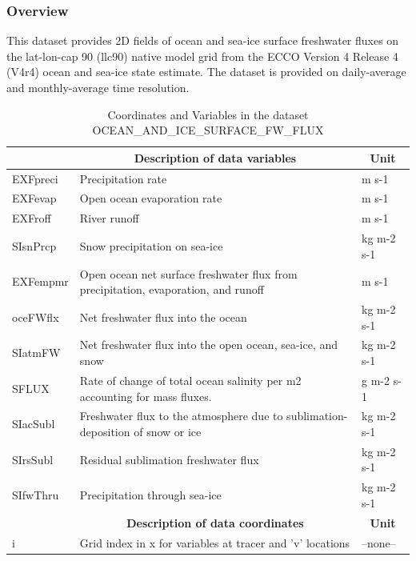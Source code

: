 \subsubsection{Overview}
This dataset provides 2D fields of ocean and sea-ice surface freshwater fluxes on the lat-lon-cap 90 (llc90) native model grid from the ECCO Version 4 Release 4 (V4r4) ocean and sea-ice state estimate. The dataset is provided on daily-average and monthly-average time resolution. 
\begin{longtable}{|m{}|m{}|m{}|}
\caption{Coordinates and Variables in the dataset OCEAN\_AND\_ICE\_SURFACE\_FW\_FLUX}
\label{tab:table-OCEAN_AND_ICE_SURFACE_FW_FLUX-fields} \\ 
\hline \endhead \hline \endfoot
\rowcolor{lightgray} \multicolumn{1}{|c|}{\textbf{Variables}} & \multicolumn{1}{|c|}{\textbf{Description of data variables}} &  \multicolumn{1}{|c|}{\textbf{Unit}}\\ \hline
EXFpreci &Precipitation rate &m s-1  \\ \hline
EXFevap &Open ocean evaporation rate &m s-1  \\ \hline
EXFroff &River runoff &m s-1  \\ \hline
SIsnPrcp &Snow precipitation on sea-ice &kg m-2 s-1  \\ \hline
EXFempmr &Open ocean net surface freshwater flux from precipitation, evaporation, and runoff &m s-1  \\ \hline
oceFWflx &Net freshwater flux into the ocean &kg m-2 s-1  \\ \hline
SIatmFW &Net freshwater flux into the open ocean, sea-ice, and snow &kg m-2 s-1  \\ \hline
SFLUX &Rate of change of total ocean salinity per m2 accounting for mass fluxes. &g m-2 s-1  \\ \hline
SIacSubl &Freshwater flux to the atmosphere due to sublimation-deposition of snow or ice &kg m-2 s-1  \\ \hline
SIrsSubl &Residual sublimation freshwater flux &kg m-2 s-1  \\ \hline
SIfwThru &Precipitation through sea-ice &kg m-2 s-1  \\ \hline
\rowcolor{lightgray} \multicolumn{1}{|c|}{\textbf{Coordinates}} & \multicolumn{1}{|c|}{\textbf{Description of data coordinates}} &  \multicolumn{1}{|c|}{\textbf{Unit}}\\ \hline
i &Grid index in x for variables at tracer and 'v' locations &--none--  \\ \hline

\end{longtable}
